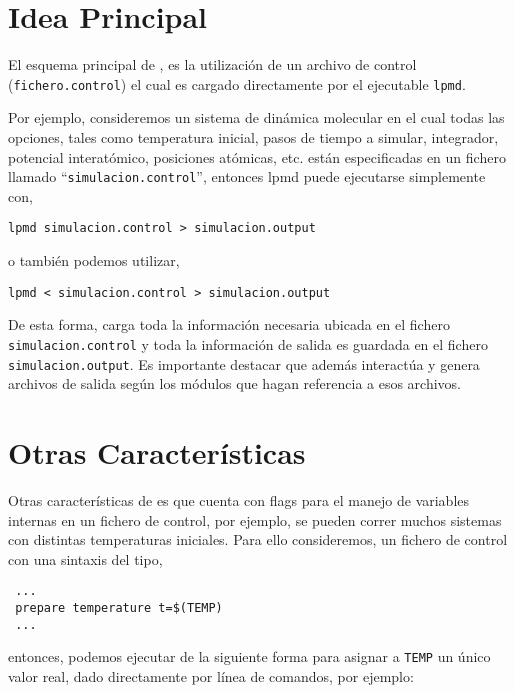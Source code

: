 \section{Idea Principal}

El esquema principal de {\lpmd}, es la utilizaci\'on de un archivo de control (\verb|fichero.control|) el cual es cargado directamente por el ejecutable \verb|lpmd|.

Por ejemplo, consideremos un sistema de din\'amica molecular en el cual todas las opciones, tales como temperatura inicial, pasos de tiempo a simular, integrador, potencial interat\'omico, posiciones at\'omicas, etc. est\'an especificadas en un fichero llamado ``\verb|simulacion.control|'', entonces lpmd puede ejecutarse simplemente con,

\begin{center}
 \texttt{lpmd simulacion.control > simulacion.output}
\end{center}

o tambi\'en podemos utilizar,

\begin{center}
 \texttt{lpmd < simulacion.control > simulacion.output}
\end{center}

De esta forma, {\lpmd} carga toda la informaci\'on necesaria ubicada en el fichero \verb|simulacion.control| y toda la informaci\'on de salida es guardada en el fichero \verb|simulacion.output|. Es importante destacar que {\lpmd} adem\'as interact\'ua y genera archivos de salida seg\'un los m\'odulos que hagan referencia a esos archivos.

\section{Otras Caracter\'isticas}

Otras caracter\'isticas de {\lpmd} es que cuenta con flags para el manejo de variables internas en un fichero de control, por ejemplo, se pueden correr muchos sistemas con distintas temperaturas iniciales. Para ello consideremos, un fichero de control con una sintaxis del tipo,

\begin{verbatim}
 ...
 prepare temperature t=$(TEMP)
 ...
\end{verbatim}

entonces, podemos ejecutar {\lpmd} de la siguiente forma para asignar a \verb|TEMP| un \'unico valor real, dado directamente por l\'inea de comandos, por ejemplo:

